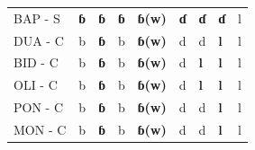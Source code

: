 \documentclass[output=paper,colorlinks,citecolor=brown
]{langscibook}
\begin{document}
\begin{table}
{\begin{tabular}{lllllllll}
BAP - S      & \textbf{ɓ}                                                                    & \textbf{ɓ}                           & \textbf{ɓ}                                                                    & \textbf{ɓ(w)}                                                             & \textbf{ɗ}            & \textbf{ɗ}                                                                & \textbf{ɗ}                             & l             \\
DUA - C      & b                                                                    & \textbf{ɓ}                           & b                                                                    & \textbf{ɓ(w)}                                                             & d            & d                                                                & \textbf{l}                             & l             \\
BID - C      & b                                                                    & \textbf{ɓ}                           & b                                                                    & \textbf{ɓ(w)}                                                             & d            & \textbf{l}                                                                & \textbf{l}                             & l             \\
OLI - C      & b                                                                    & \textbf{ɓ}                           & b                                                                    & \textbf{ɓ(w)}                                                             & d            & \textbf{l}                                                                & \textbf{l}                             & l             \\
PON - C      & b                                                                    & \textbf{ɓ}                           & b                                                                    & \textbf{ɓ(w)}                                                             & d            & d                                                                & \textbf{l}                             & l             \\
MON - C      & b                                                                    & \textbf{ɓ}                           & b                                                                    & \textbf{ɓ(w)}                                                             & d            & d                                                                & \textbf{l}                             & l             \\

\end{tabular}}
\end{table}
\end{document}

